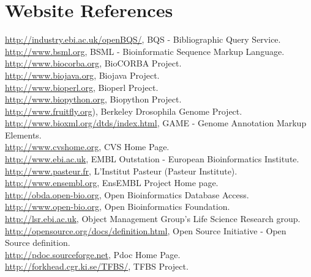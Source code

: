 \documentclass[12pt]{article}
\begin{document}
\section{Website References}
\url{http://industry.ebi.ac.uk/openBQS/}, BQS - Bibliographic Query Service.\\
\url{http://www.bsml.org}, BSML - Bioinformatic Sequence Markup Language. \\
\url{http://www.biocorba.org}, BioCORBA Project. \\
\url{http://www.biojava.org}, Biojava Project. \\
\url{http://www.bioperl.org}, Bioperl Project. \\
\url{http://www.biopython.org}, Biopython Project. \\
\url{http://www.fruitfly.org}), Berkeley Drosophila Genome Project.\\
\url{http://www.bioxml.org/dtds/index.html},  GAME - Genome
Annotation Markup Elements. \\ 
\url{http://www.cvshome.org}, CVS Home Page. \\
\url{http://www.ebi.ac.uk}, EMBL Outstation - European Bioinformatics
Institute. \\ 
\url{http://www.pasteur.fr}, L'Institut Pasteur (Pasteur Institute). \\
\url{http://www.ensembl.org}, EnsEMBL Project Home page. \\
\url{http://obda.open-bio.org}, Open Bioinformatics Database Access. \\
\url{http://www.open-bio.org}, Open Bioinformatics Foundation. \\
\url{http://lsr.ebi.ac.uk}, Object Management Group's Life Science Research group. \\
\url{http://opensource.org/docs/definition.html}, Open Source
Initiative - Open Source definition. \\
\url{http://pdoc.sourceforge.net}, Pdoc Home Page. \\
\url{http://forkhead.cgr.ki.se/TFBS/}, TFBS Project. \\

\newpage 


\pagestyle{fancy}
\fancyhf{}
\renewcommand{\headrulewidth}{0pt}

\end{document}
